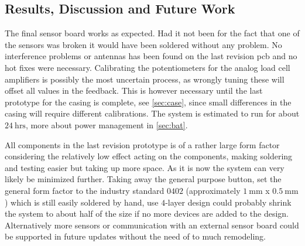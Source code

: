 \subsection{Results, Discussion and Future Work}\label{sec:hw:tip2}
The final sensor board works as expected. Had it not been for the fact that one of the sensors was broken it would have been soldered without any problem. No interference problems or antennas has been found on the last revision \gls{pcb} and no hot fixes were necessary.
Calibrating the potentiometers for the analog load cell amplifiers is possibly the most uncertain process, as wrongly tuning these will offset all values in the feedback. This is however necessary until the last prototype for the casing is complete, see \autoref{sec:case}, since small differences in the casing will require different calibrations.
The system is estimated to run for about $24~\textrm{hrs}$, more about power management in \autoref{sec:bat}. 

All components in the last revision prototype is of a rather large form factor considering the relatively low effect acting on the components, making soldering and testing easier but taking up more space. As it is now the system can very likely be minimized further. Taking away the general purpose button, set the general form factor to the industry standard $0402$ (approximately $1~\textrm{mm}$ x $0.5~\textrm{mm}$) which is still easily soldered by hand, use $4$-layer design could probably shrink the system to about half of the size if no more devices are added to the design. Alternatively more sensors or communication with an external sensor board could be supported in future updates without the need of to much remodeling. 


